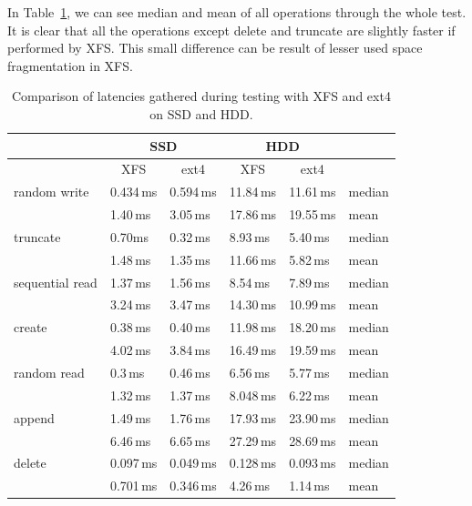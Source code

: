 \documentclass[
  color, %
  table, %
  lof,   %
  lot,   %
]{fithesis3}
\begin{document}
In Table~\ref{tab:hdd_ssd_xfs_ext4}, we can see median and mean of all operations through the whole test. It is clear that all the operations except delete and truncate are slightly faster if performed by XFS. This small difference can be result of lesser used space fragmentation in XFS.

\begin{table}
\centering

\begin{tabular}{|l|l|l|l|l|l|}
\hline
   & \multicolumn{2}{|c|}{SSD} & \multicolumn{2}{|c|}{HDD} & \\ \hline

 & \multicolumn{1}{|c|}{XFS} & \multicolumn{1}{|c|}{ext4} & \multicolumn{1}{|c|}{XFS} & \multicolumn{1}{|c|}{ext4} &  \\
\hline
    random write & 0.434\,ms & 0.594\,ms & 11.84\,ms & 11.61\,ms & median\\
 \hline
                 & 1.40\,ms & 3.05\,ms & 17.86\,ms & 19.55\,ms & mean\\
    \hline
        truncate & 0.70ms & 0.32\,ms & 8.93\,ms & 5.40\,ms & median\\
    \hline
                 & 1.48\,ms & 1.35\,ms& 11.66\,ms & 5.82\,ms & mean\\
    \hline
           sequential read & 1.37\,ms & 1.56\,ms & 8.54\,ms & 7.89\,ms & median\\
    \hline
                 & 3.24\,ms & 3.47\,ms & 14.30\,ms & 10.99\,ms & mean\\
    \hline
          create & 0.38\,ms & 0.40\,ms & 11.98\,ms & 18.20\,ms & median\\
    \hline
                 & 4.02\,ms & 3.84\,ms & 16.49\,ms & 19.59\,ms & mean\\
    \hline
     random read & 0.3\,ms & 0.46\,ms & 6.56\,ms & 5.77\,ms & median\\
    \hline
                 & 1.32\,ms & 1.37\,ms & 8.048\,ms  & 6.22\,ms &mean\\
    \hline
          append & 1.49\,ms & 1.76\,ms & 17.93\,ms & 23.90\,ms & median \\
    \hline
                 & 6.46\,ms & 6.65\,ms & 27.29\,ms & 28.69\,ms &mean\\
    \hline
          delete & 0.097\,ms & 0.049\,ms & 0.128\,ms & 0.093\,ms & median\\
    \hline
                & 0.701\,ms & 0.346\,ms & 4.26\,ms & 1.14\,ms & mean\\
    \hline
\end{tabular}
\caption{Comparison of latencies gathered during testing with XFS and ext4 on SSD and HDD.}
\label{tab:hdd_ssd_xfs_ext4}
\end{table}
\end{document}

